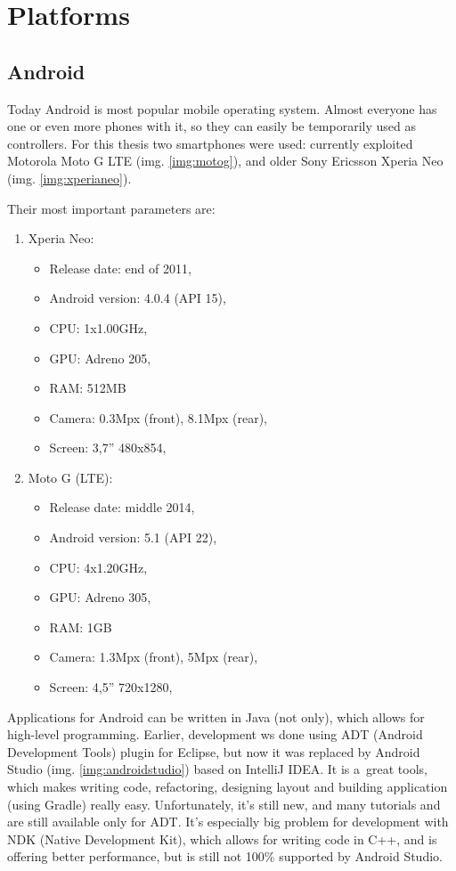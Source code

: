 \chapter{Platforms}

\section{Android}
Today Android is most popular mobile operating system.
Almost everyone has one or even more phones with it, so they can easily be
temporarily used as controllers.
For this thesis two smartphones were used: currently exploited Motorola Moto G
LTE (img. \ref{img:motog}), and older Sony Ericsson Xperia Neo (img.
\ref{img:xperianeo}).

Their most important parameters are:
\begin{enumerate}
  \item Xperia Neo:
  	\begin{itemize}
  	  \item Release date: end of 2011,
  	  \item Android version: 4.0.4 (API 15),
  	  \item CPU: 1x1.00GHz,
  	  \item GPU: Adreno 205,
  	  \item RAM: 512MB
  	  \item Camera: 0.3Mpx (front), 8.1Mpx (rear),
  	  \item Screen: 3,7'' 480x854,
  	\end{itemize}
  \item Moto G (LTE):
  	\begin{itemize}
  	  \item Release date: middle 2014,
  	  \item Android version: 5.1 (API 22),
  	  \item CPU: 4x1.20GHz,
  	  \item GPU: Adreno 305,
  	  \item RAM: 1GB
  	  \item Camera: 1.3Mpx (front), 5Mpx (rear),
  	  \item Screen: 4,5'' 720x1280,
  	\end{itemize}
\end{enumerate}

Applications for Android can be written in Java (not only), which allows for
high-level programming.
Earlier, development ws done using ADT (Android Development Tools) plugin for
Eclipse, but now it was replaced by Android Studio (img.
\ref{img:androidstudio}) based on IntelliJ IDEA.
It is a~great tools, which makes writing code, refactoring, designing layout and
building application (using Gradle) really easy.
Unfortunately, it's still new, and many tutorials and are still available only
for ADT.
It's especially big problem for development with NDK (Native Development Kit),
which allows for writing code in C++, and is offering better performance, but is
still not 100\% supported by Android Studio.


